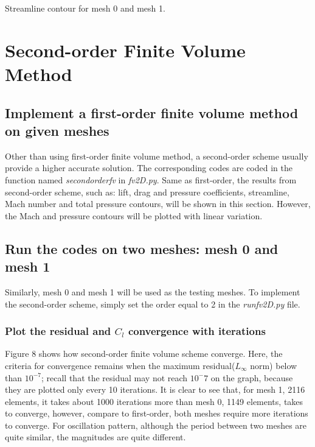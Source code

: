 \documentclass[letterpaper,onecolumn,12pt]{article}
\makeatletter
\newenvironment{figurehere}
  {\def\@captype{figure}}{}
\makeatother
\begin{document}
\begin{figurehere}
 \centering 
  \hspace{.05cm} 
  \caption{Streamline contour for mesh 0 and mesh 1.} 
\end{figurehere}


\section{Second-order Finite Volume Method}
\subsection{Implement a first-order finite volume method on given meshes}
Other than using first-order finite volume method, a second-order scheme usually provide a higher accurate solution. The corresponding codes are coded in the function named \textit{secondorderfv} in \textit{fv2D.py}. Same as first-order, the results from second-order scheme, such as: lift, drag and pressure coefficients, streamline, Mach number and total pressure contours, will be shown in this section. However, the Mach and pressure contours will be plotted with linear variation.

\subsection{Run the codes on two meshes: mesh 0 and mesh 1}
Similarly, mesh 0 and mesh 1 will be used as the testing meshes. To implement the second-order scheme, simply set the order equal to 2 in the \textit{runfv2D.py} file.

\subsubsection{Plot the residual and $C_l$ convergence with iterations}
Figure 8 shows how second-order finite volume scheme converge. Here, the criteria for convergence remains when the maximum residual($L_{\infty}$ norm) below than $10^{-7}$; recall that the residual may not reach $10^-7$ on the graph, because they are plotted only every 10 iterations. It is clear to see that, for mesh 1, 2116 elements, it takes about 1000 iterations more than mesh 0, 1149 elements, takes to converge, however, compare to first-order, both meshes require more iterations to converge. For oscillation pattern, although the period between two meshes are quite similar, the magnitudes are quite different. \\ 
\end{document}
